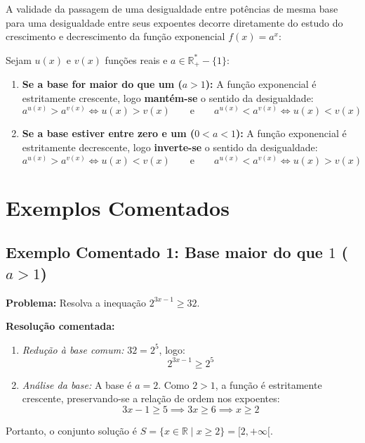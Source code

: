 \documentclass[12pt,a4paper]{report}
\begin{document}
	A validade da passagem de uma desigualdade entre potências de mesma base para uma desigualdade entre seus expoentes decorre diretamente do estudo do crescimento e decrescimento da função exponencial $f(x) = a^x$:
	
	\begin{destaque}
		Sejam $u(x)$ e $v(x)$ funções reais e $a \in \mathbb{R}^*_+ - \{1\}$:
		\begin{enumerate}
			\item \textbf{Se a base for maior do que um ($a > 1$):} A função exponencial é estritamente crescente, logo \textbf{mantém-se} o sentido da desigualdade:
			\[
			a^{u(x)} > a^{v(x)} \iff u(x) > v(x) \qquad \text{e} \qquad a^{u(x)} < a^{v(x)} \iff u(x) < v(x)
			\]
			\item \textbf{Se a base estiver entre zero e um ($0 < a < 1$):} A função exponencial é estritamente decrescente, logo \textbf{inverte-se} o sentido da desigualdade:
			\[
			a^{u(x)} > a^{v(x)} \iff u(x) < v(x) \qquad \text{e} \qquad a^{u(x)} < a^{v(x)} \iff u(x) > v(x)
			\]
		\end{enumerate}
	\end{destaque}
	
	\section{Exemplos Comentados}
	\label{subsec:exemplos_inequacoes}
	
	\subsection*{Exemplo Comentado 1: Base maior do que $1$ ($a > 1$)}
	
	\textbf{Problema:} Resolva a inequação $2^{3x - 1} \geqslant 32$.
	
	\textbf{Resolução comentada:}
	\begin{enumerate}[label=\alph*)]
		\item \textit{Redução à base comum:} $32 = 2^5$, logo:
		\[
		2^{3x - 1} \geqslant 2^5
		\]
		\item \textit{Análise da base:} A base é $a = 2$. Como $2 > 1$, a função é estritamente crescente, preservando-se a relação de ordem nos expoentes:
		\[
		3x - 1 \geqslant 5 \implies 3x \geqslant 6 \implies x \geqslant 2
		\]
	\end{enumerate}
	Portanto, o conjunto solução é $S = \{x \in \mathbb{R} \mid x \geqslant 2\} = [2, +\infty[$.
	
\end{document}
